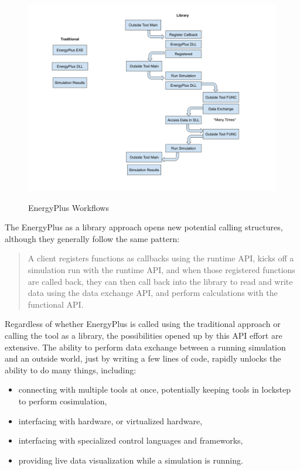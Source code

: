 \documentclass[5p, authoryear]{elsarticle}
\begin{document}
\begin{figure}
\begin{center}
\label{figure:api:uses:workflows}
\includegraphics[width=\columnwidth]{images/api_workflows.png}
\caption{EnergyPlus Workflows}
\end{center}
\end{figure}

The EnergyPlus as a library approach opens new potential calling structures, although they generally follow the same pattern: 
\begin{quote}
A client registers functions as callbacks using the runtime API, kicks off a simulation run with the runtime API, and when those registered functions are called back, they can then call back into the library to read and write data using the data exchange API, and perform calculations with the functional API.
\end{quote}

Regardless of whether EnergyPlus is called using the traditional approach or calling the tool as a library, the possibilities opened up by this API effort are extensive.
The ability to perform data exchange between a running simulation and an outside world, just by writing a few lines of code, rapidly unlocks the ability to do many things, including:
\begin{itemize}
 \item connecting with multiple tools at once, potentially keeping tools in lockstep to perform cosimulation,
 \item interfacing with hardware, or virtualized hardware,
 \item interfacing with specialized control languages and frameworks,
 \item providing live data visualization while a simulation is running.
\end{itemize}
\end{document}
